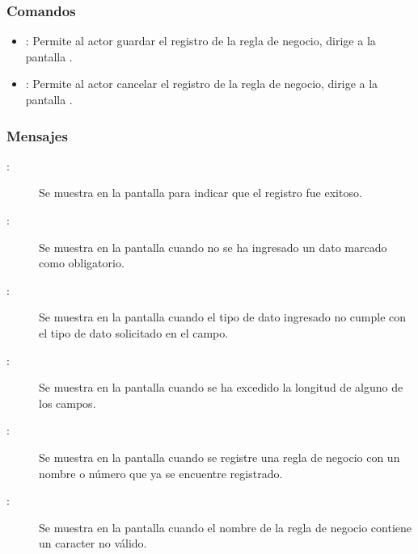 \subsubsection{Comandos}
\begin{itemize}
	\item {}: Permite al actor guardar el registro de la regla de negocio, dirige a la pantalla .
	\item {}: Permite al actor cancelar el registro de la regla de negocio, dirige a la pantalla .
\end{itemize}

\subsubsection{Mensajes}
	
\begin{description}
	\item[:] Se muestra en la pantalla  para indicar que el registro fue exitoso.
	\item[:] Se muestra en la pantalla  cuando no se ha ingresado un dato marcado como obligatorio.
	\item[:] Se muestra en la pantalla  cuando el tipo de dato ingresado no cumple con el tipo de dato solicitado en el campo.
	\item[:] Se muestra en la pantalla  cuando se ha excedido la longitud de alguno de los campos.
	\item[:] Se muestra en la pantalla  cuando se registre una regla de negocio con un nombre o número que ya se encuentre registrado.
	\item[:] Se muestra en la pantalla  cuando el nombre de la regla de negocio contiene un caracter no válido.
\end{description}
